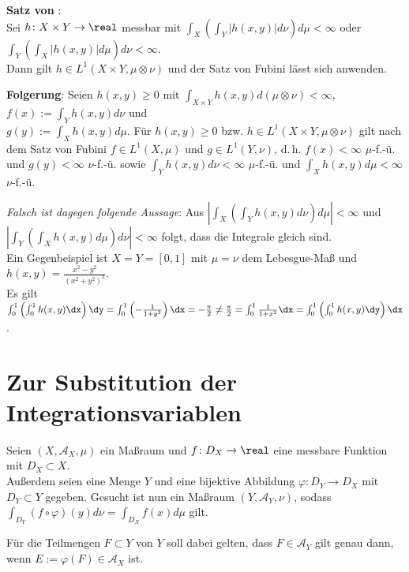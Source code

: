 \textbf{Satz von }: \\
Sei $h\colon X \times Y \rightarrow \real$ messbar mit
$\int_X (\int_Y |h(x, y)|d\nu) d\mu < \infty$ oder
$\int_Y (\int_X |h(x, y)|d\mu) d\nu < \infty$. \\
Dann gilt $h \in L^1(X \times Y, \mu \otimes \nu)$
und der Satz von Fubini lässt sich anwenden.

\linie
\pagebreak

\textbf{Folgerung}:
Seien $h(x, y) \ge 0$ mit $\int_{X \times Y} h(x, y)
d(\mu \otimes \nu) < \infty$, $f(x) := \int_Y h(x, y) d\nu$ und \\
$g(y) := \int_X h(x, y) d\mu$.
Für $h(x, y) \ge 0$ bzw. $h \in L^1(X \times Y, \mu \otimes \nu)$
gilt nach dem Satz von Fubini $f \in L^1(X, \mu)$ und $g \in L^1(Y, \nu)$,
d.\,h. $f(x) < \infty$ $\mu$-f.-ü. und $g(y) < \infty$ $\nu$-f.-ü. sowie
$\int_Y h(x, y) d\nu < \infty$ $\mu$-f.-ü. und
$\int_X h(x, y) d\mu < \infty$ $\nu$-f.-ü.

\linie

\emph{Falsch ist dagegen folgende Aussage}:
Aus $|\int_X (\int_Y h(x, y) d\nu) d\mu| < \infty$ und \\
$|\int_Y (\int_X h(x, y) d\mu) d\nu| < \infty$ folgt, dass die
Integrale gleich sind. \\
Ein Gegenbeispiel ist $X = Y = [0, 1]$ mit $\mu = \nu$ dem Lebesgue-Maß
und $h(x, y) = \frac{x^2 - y^2}{(x^2 + y^2)^2}$. \\
Es gilt $\int_0^1 \left(\int_0^1 h(x, y) \dx\right) \dy =
\int_0^1 \left(-\frac{1}{1 + y^2}\right) \dx =
-\frac{\pi}{2} \not= \frac{\pi}{2} =
\int_0^1 \frac{1}{1 + x^2} \dx = \int_0^1 \left(\int_0^1 h(x, y) \dy\right) \dx$.

\section{%
    Zur Substitution der Integrationsvariablen%
}

Seien $(X, \mathcal{A}_X, \mu)$ ein Maßraum und $f\colon D_X \rightarrow \real$
eine messbare Funktion mit $D_X \subset X$. \\
Außerdem seien eine Menge $Y$ und eine bijektive Abbildung
$\varphi\colon D_Y \rightarrow D_X$ mit $D_Y \subset Y$ gegeben.
Gesucht ist nun ein Maßraum $(Y, \mathcal{A}_Y, \nu)$, sodass
$\int_{D_Y} (f \circ \varphi)(y) d\nu = \int_{D_X} f(x) d\mu$ gilt.

Für die Teilmengen $F \subset Y$ von $Y$ soll dabei gelten, dass
$F \in \mathcal{A}_Y$ gilt
genau dann, wenn $E := \varphi(F) \in \mathcal{A}_X$ ist.

